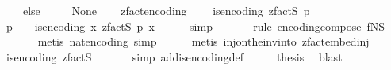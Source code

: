 \begin{isabellebody}
\ \ \ \ else\isanewline
\ \ \ \ \ None\isanewline
\ \ {\isacharparenright}{\kern0pt}{\isachardoublequoteclose}\isanewline
\isanewline
{}\isamarkupfalse%
\ zfact{\isacharunderscore}{\kern0pt}encoding\ {\isacharcolon}{\kern0pt}\ \isanewline
\ \ {\isachardoublequoteopen}is{\isacharunderscore}{\kern0pt}encoding\ {\isacharparenleft}{\kern0pt}zfact\isactrlsub S\ p{\isacharparenright}{\kern0pt}{\isachardoublequoteclose}\isanewline
%
\isadelimproof
%
\endisadelimproof
%
\isatagproof
{}\isamarkupfalse%
\ {\isacharminus}{\kern0pt}\isanewline
\ \ \isamarkupfalse%
\ {\isachardoublequoteopen}p\ {\isachargreater}{\kern0pt}\ {}\ {\isasymLongrightarrow}\ is{\isacharunderscore}{\kern0pt}encoding\ {\isacharparenleft}{\kern0pt}{\isasymlambda}x{\isachardot}{\kern0pt}\ zfact\isactrlsub S\ p\ x{\isacharparenright}{\kern0pt}{\isachardoublequoteclose}\isanewline
\ \ \ \ \isamarkupfalse%
\ simp\ \isanewline
\ \ \ \ \isamarkupfalse%
\ {\isacharparenleft}{\kern0pt}rule\ encoding{\isacharunderscore}{\kern0pt}compose{\isacharbrackleft}{\kern0pt}\ f{\isacharequal}{\kern0pt}{\isachardoublequoteopen}N\isactrlsub S{\isachardoublequoteclose}{\isacharbrackright}{\kern0pt}{\isacharparenright}{\kern0pt}\isanewline
\ \ \ \ \ \isamarkupfalse%
\ {\isacharparenleft}{\kern0pt}metis\ nat{\isacharunderscore}{\kern0pt}encoding{\isacharcomma}{\kern0pt}\ simp{\isacharparenright}{\kern0pt}\isanewline
\ \ \ \ \isamarkupfalse%
\ {\isacharparenleft}{\kern0pt}metis\ inj{\isacharunderscore}{\kern0pt}on{\isacharunderscore}{\kern0pt}the{\isacharunderscore}{\kern0pt}inv{\isacharunderscore}{\kern0pt}into\ zfact{\isacharunderscore}{\kern0pt}embed{\isacharunderscore}{\kern0pt}inj{\isacharparenright}{\kern0pt}\isanewline
\ \ \isamarkupfalse%
\ \isamarkupfalse%
\ {\isachardoublequoteopen}is{\isacharunderscore}{\kern0pt}encoding\ {\isacharparenleft}{\kern0pt}zfact\isactrlsub S\ {}{\isacharparenright}{\kern0pt}{\isachardoublequoteclose}\isanewline
\ \ \ \ \isamarkupfalse%
\ {\isacharparenleft}{\kern0pt}simp\ add{\isacharcolon}{\kern0pt}is{\isacharunderscore}{\kern0pt}encoding{\isacharunderscore}{\kern0pt}def{\isacharparenright}{\kern0pt}\isanewline
\ \ \isamarkupfalse%
\ \isamarkupfalse%
\ {\isacharquery}{\kern0pt}thesis\ \isamarkupfalse%
\ blast\isanewline
{}\isamarkupfalse%
%
\endisatagproof
{\isafoldproof}%
%
\isadelimproof
\isanewline

\end{isabellebody}
